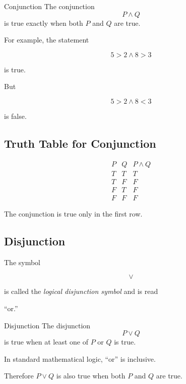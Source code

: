 \begin{definitionbox}{Conjunction}
The conjunction
\[ P\land Q \]
is true exactly when both \(P\) and \(Q\) are true.
\end{definitionbox}

For example, the statement

\[ 5>2\land 8>3 \]

is true.

But

\[ 5>2\land 8<3 \]

is false.

\subsection{Truth Table for Conjunction}
\label{subsec:conjunction-truth-table}

\[
\begin{array}{c|c|c}
P & Q & P\land Q\\ \hline
T & T & T\\
T & F & F\\
F & T & F\\
F & F & F
\end{array}
\]

The conjunction is true only in the first row.

\subsection{Disjunction}
\label{subsec:disjunction}

The symbol

\[ \lor \]

is called the \emph{logical disjunction symbol} and is read

\begin{center}
``or.''
\end{center}

\begin{definitionbox}{Disjunction}
The disjunction
\[ P\lor Q \]
is true when at least one of \(P\) or \(Q\) is true.
\end{definitionbox}

In standard mathematical logic, ``or'' is inclusive.

Therefore \(P\lor Q\) is also true when both \(P\) and \(Q\) are true.

